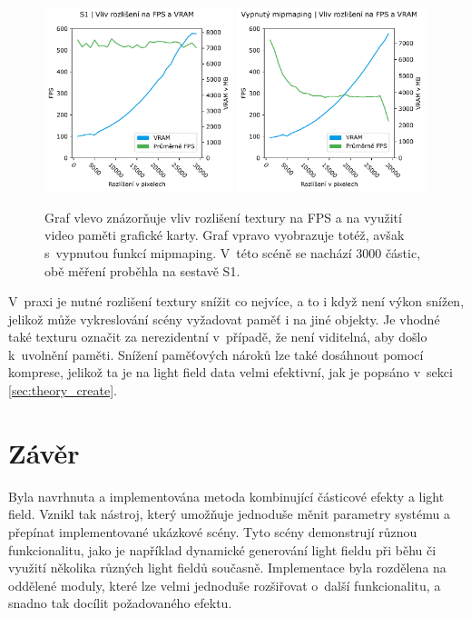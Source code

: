 \begin{figure}[H]
	\centering
	\includegraphics[width=0.49\textwidth]{obrazky-figures/resolution_mipmaping_on2.pdf}
	\includegraphics[width=0.49\textwidth]{obrazky-figures/resolution_mipmaping_off2.pdf}

	\caption{Graf vlevo znázorňuje vliv rozlišení textury na FPS a na využití video paměti grafické karty. Graf vpravo vyobrazuje totéž, avšak s~vypnutou funkcí mipmaping. V~této scéně se nachází 3000 částic, obě měření proběhla na sestavě S1.}
	\label{fig:graph_res_mipmapping}
\end{figure}

V~praxi je nutné rozlišení textury snížit co nejvíce, a to i když není výkon snížen, jelikož může vykreslování scény vyžadovat paměť i na jiné objekty. Je vhodné také texturu označit za nerezidentní v~případě, že není viditelná, aby došlo k~uvolnění paměti. Snížení paměťových nároků lze také dosáhnout pomocí komprese, jelikož ta je na light field data velmi efektivní, jak je popsáno v~sekci \ref{sec:theory_create}.

\label{sec:mereni}

\chapter{Závěr}
Byla navrhnuta a implementována metoda kombinující částicové efekty a light field. Vznikl tak nástroj, který umožňuje jednoduše měnit parametry systému a přepínat implementované ukázkové scény. Tyto scény demonstrují různou funkcionalitu, jako je například dynamické generování light fieldu při běhu či využití několika různých light fieldů současně. Implementace byla rozdělena na oddělené moduly, které lze velmi jednoduše rozšiřovat o~další funkcionalitu, a snadno tak docílit požadovaného efektu.  

